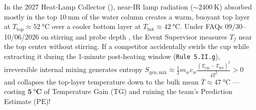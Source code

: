 \begin{devicebox}
In the 2027 Heat-Lamp Collector (), near-IR lamp radiation ($\sim\SI{2400}{\kelvin}$) absorbed mostly in the top $\SI{10}{\milli\meter}$ of the water column creates a warm, buoyant top layer at $T_{\mathrm{top}} \approx \SI{52}{\celsius}$ over a cooler bottom layer at $T_{\mathrm{bot}} \approx \SI{42}{\celsius}$. Under FAQs 09/30--10/06/2026 on stirring and probe depth , the Event Supervisor measures $T_f$ near the top center without stirring. If a competitor accidentally swirls the cup while extracting it during the 1-minute post-heating window (\texttt{Rule 5.II.g}), irreversible internal mixing generates entropy $S_{\mathrm{gen,mix}} \approx \frac{1}{2}m_w c_w \frac{(T_{\mathrm{top}} - T_{\mathrm{bot}})^2}{4\bar{T}^2} > 0$ and collapses the top-layer temperature down to the bulk mean $\bar{T} \approx \SI{47}{\celsius}$ — costing $\mathbf{\SI{5}{\celsius}}$ of Temperature Gain ($\mathrm{TG}$) and ruining the team's Prediction Estimate ($\mathrm{PE}$)!
\end{devicebox}

